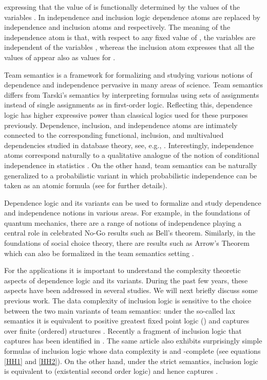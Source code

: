 \documentclass{article}
\theoremstyle{plain}
\theoremstyle{definition}
\begin{document}
expressing that the value of  is functionally determined by the values of the variables . 
In independence and inclusion logic dependence atoms are replaced by independence and inclusion atoms 
 and  
respectively. The meaning of the independence atom is that, with respect to any fixed value of  , the variables   are independent of the variables , whereas the  inclusion atom expresses that all the values of  appear also as values for . 

  
Team semantics is a  framework for formalizing and studying  various notions of dependence and independence  pervasive in many areas of science.  Team semantics differs from Tarski's semantics by interpreting formulas using sets of assignments instead of single assignments as in  first-order logic.  
 Reflecting this, dependence logic  has higher expressive power than classical logics used for these purposes previously.  Dependence, inclusion, and independence  atoms are intimately connected to the  corresponding functional, inclusion, and multivalued  dependencies studied in  database theory, see, e.g., \cite{DBLP:conf/foiks/HannulaK14}.  Interestingly, independence atoms correspond naturally to a qualitative analogue of the notion of conditional independence in statistics  \cite{DBLP:journals/networks/GeigerVP90}. On the other hand,  team semantics can be naturally generalized to a probabilistic variant in which probabilistic independence can be taken  as an atomic formula (see \cite{HannulaHKKV19,HKMV18} for further details). 

 Dependence logic and its variants can be  used to formalize and study dependence and independence notions in various areas. For example, in the foundations of quantum mechanics, there  are a range of notions of independence playing a central role in celebrated No-Go results such as Bell's theorem. 
Similarly, in the foundations of social choice theory, there are results such as Arrow's Theorem which  can also be formalized in the team semantics setting   \cite{2014arXiv1409.5537H,PacuitY16}.


For the applications it is important to understand the complexity theoretic aspects  of dependence logic and its variants. During the past few years,  these aspects have been addressed in several studies. We will next briefly discuss some previous work. 
The data complexity of inclusion logic  is sensitive to the choice between the two main variants of team semantics: under the so-called  lax semantics it is equivalent to positive greatest fixed point logic () and captures  over finite (ordered) structures \cite{gallhella13}. Recently a  fragment of inclusion logic that captures  has been identified in \cite{HannulaH19}. The same article also exhibits surprisingly simple formulas of inclusion logic whose data complexity is  and -complete (see equations  \eqref{HH1} and \eqref{HH2}).
 On the other hand, under the strict semantics, inclusion logic is equivalent to  (existential second order logic) and hence captures  \cite{galhankon13}.  
\end{document}
